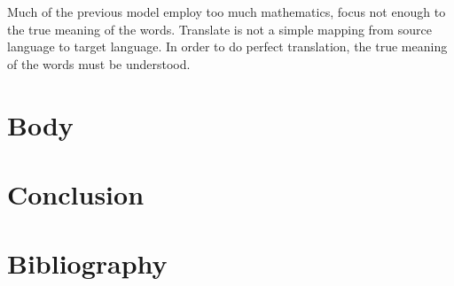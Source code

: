 \documentclass[12pt,a4paper]{article}
\begin{document}
Much of the previous model employ too much mathematics, focus not enough to the true meaning of the words.
Translate is not a simple mapping from source language to target language. In order to do perfect translation,
the true meaning of the words must be understood. 


\section{Body}
\section{Conclusion}
\section{Bibliography}
\end{document}
